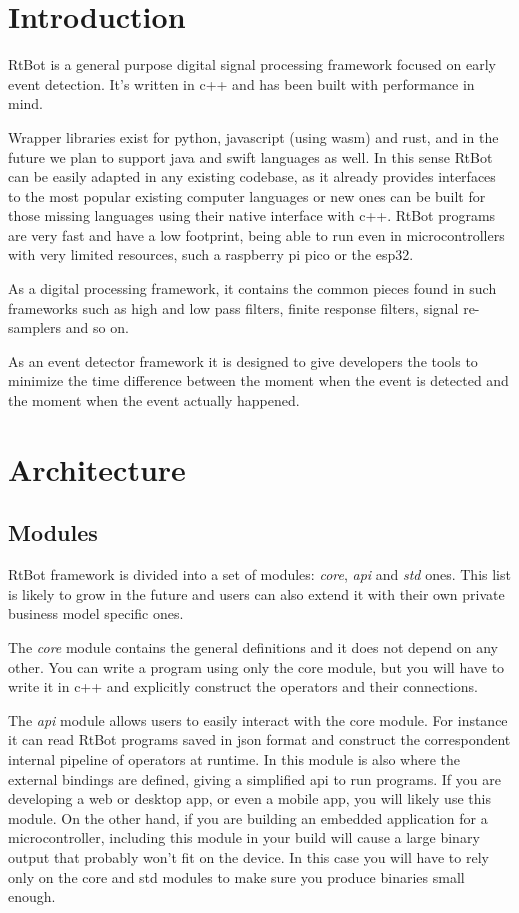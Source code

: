 \documentclass[preprint,1p,times]{elsarticle}
\begin{document}

\section{Introduction}
\label{}
RtBot is a general purpose digital signal processing framework focused on early event detection. 
It’s written in c++ and has been built with performance in mind.

Wrapper libraries exist for python, javascript (using wasm) and rust, and in the future we plan 
to support java and swift languages as well. In this sense RtBot can be easily adapted in any 
existing codebase, as it already provides interfaces to the most popular existing computer 
languages or new ones can be built for those missing languages using their native interface 
with c++. RtBot programs are very fast and have a low footprint, being able to run even in 
microcontrollers with very limited resources, such a raspberry pi pico or the esp32.

As a digital processing framework, it contains the common pieces found in such frameworks such as 
high and low pass filters, finite response filters, signal re-samplers and so on. 

As an event detector framework it is designed to give developers the tools to minimize the time 
difference between the moment when the event is detected and the moment when the event actually 
happened.


\section{Architecture}
\subsection{Modules}
RtBot framework is divided into a set of modules: \textit{core}, \textit{api} and \textit{std} ones. This 
list is likely to grow in the future and users can also extend it with their own 
private business model specific ones.


The \textit{core} module contains the general definitions and it does not depend on any 
other. You can write a program using only the core module, but you will have to 
write it in c++ and explicitly construct the operators and their connections. 


The \textit{api} module allows users to easily interact with the core module. For instance 
it can read RtBot programs saved in json format and construct the correspondent 
internal pipeline of operators at runtime. In this module is also where the 
external bindings are defined, giving a simplified api to run programs. If you are 
developing a web or desktop app, or even a mobile app, you will likely use this 
module. On the other hand, if you are building an embedded application for a 
microcontroller, including this module in your build will cause a large binary 
output that probably won’t fit on the device. In this case you will have to rely 
only on the core and std modules to make sure you produce binaries small enough.
\end{document}
